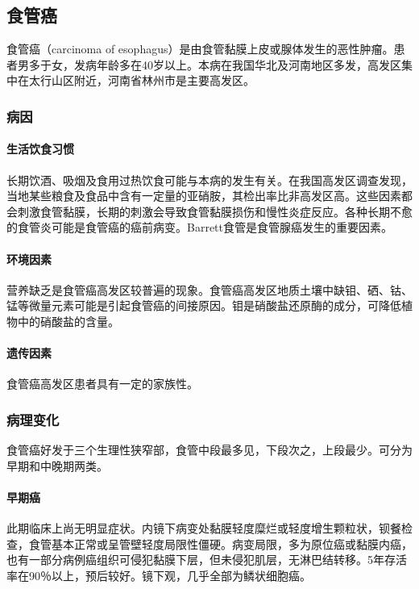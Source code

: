 \subsection{食管癌}

食管癌（carcinoma of
esophagus）是由食管黏膜上皮或腺体发生的恶性肿瘤。患者男多于女，发病年龄多在40岁以上。本病在我国华北及河南地区多发，高发区集中在太行山区附近，河南省林州市是主要高发区。

\subsubsection{病因}

\paragraph{生活饮食习惯}
长期饮酒、吸烟及食用过热饮食可能与本病的发生有关。在我国高发区调查发现，当地某些粮食及食品中含有一定量的亚硝胺，其检出率比非高发区高。这些因素都会刺激食管黏膜，长期的刺激会导致食管黏膜损伤和慢性炎症反应。各种长期不愈的食管炎可能是食管癌的癌前病变。Barrett食管是食管腺癌发生的重要因素。

\paragraph{环境因素}
营养缺乏是食管癌高发区较普遍的现象。食管癌高发区地质土壤中缺钼、硒、钴、锰等微量元素可能是引起食管癌的间接原因。钼是硝酸盐还原酶的成分，可降低植物中的硝酸盐的含量。

\paragraph{遗传因素}
食管癌高发区患者具有一定的家族性。

\subsubsection{病理变化}

食管癌好发于三个生理性狭窄部，食管中段最多见，下段次之，上段最少。可分为早期和中晚期两类。

\paragraph{早期癌}
此期临床上尚无明显症状。内镜下病变处黏膜轻度糜烂或轻度增生颗粒状，钡餐检查，食管基本正常或呈管壁轻度局限性僵硬。病变局限，多为原位癌或黏膜内癌，也有一部分病例癌组织可侵犯黏膜下层，但未侵犯肌层，无淋巴结转移。5年存活率在90％以上，预后较好。镜下观，几乎全部为鳞状细胞癌。

